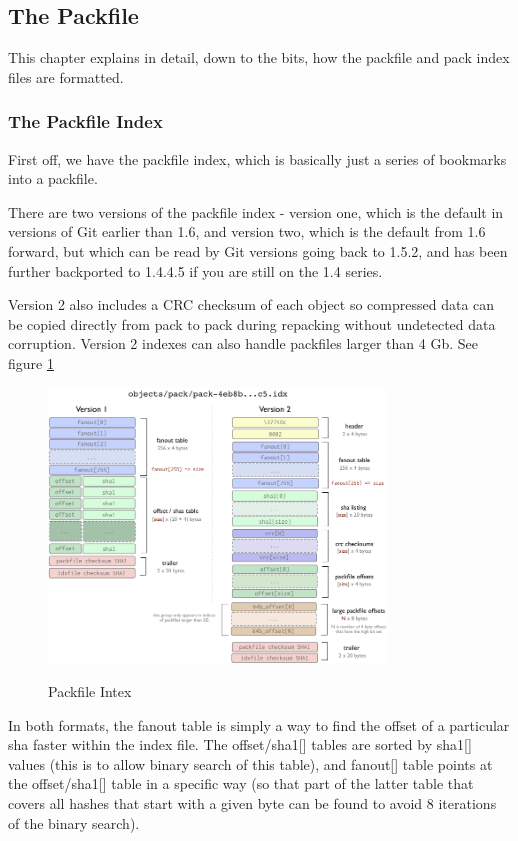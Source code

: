 \subsection{The Packfile}
This chapter explains in detail, down to the bits, how the packfile and pack
index files are formatted.

\subsubsection{The Packfile Index}
First off, we have the packfile index, which is basically just a series of
bookmarks into a packfile.

There are two versions of the packfile index - version one, which is the
default in versions of Git earlier than 1.6, and version two, which is the
default from 1.6 forward, but which can be read by Git versions going back to
1.5.2, and has been further backported to 1.4.4.5 if you are still on the 1.4
series.

Version 2 also includes a CRC checksum of each object so compressed data can be
copied directly from pack to pack during repacking without undetected data
corruption. Version 2 indexes can also handle packfiles larger than 4 Gb. See
figure \ref{fig:packfileindex}
\begin{figure}[tbp]
\centering
\includegraphics[width=0.80\textwidth]{content/git/packfile-index.png}
\label{fig:packfileindex}
\caption{Packfile Intex}
\end{figure}

In both formats, the fanout table is simply a way to find the offset of a
particular sha faster within the index file. The offset/sha1[] tables are
sorted by sha1[] values (this is to allow binary search of this table), and
fanout[] table points at the offset/sha1[] table in a specific way (so that
part of the latter table that covers all hashes that start with a given byte
can be found to avoid 8 iterations of the binary search).

